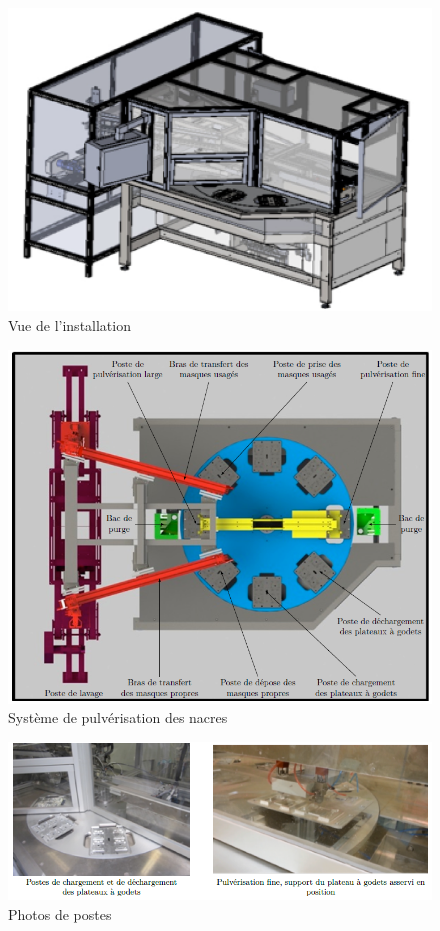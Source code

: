 \begin{figure}[!h]
\centering\includegraphics[width=0.7\linewidth]{img/fig05}
 \caption{Vue de l’installation}
 \label{img05}
\end{figure}

\begin{figure}[!h]
\centering\includegraphics[width=0.7\linewidth]{img/fig06}
 \caption{Système de pulvérisation des nacres}
 \label{img06}
\end{figure}

\begin{figure}[!h]
\centering\includegraphics[width=0.95\linewidth]{img/fig07}
 \caption{Photos de postes}
 \label{img07}
\end{figure}


